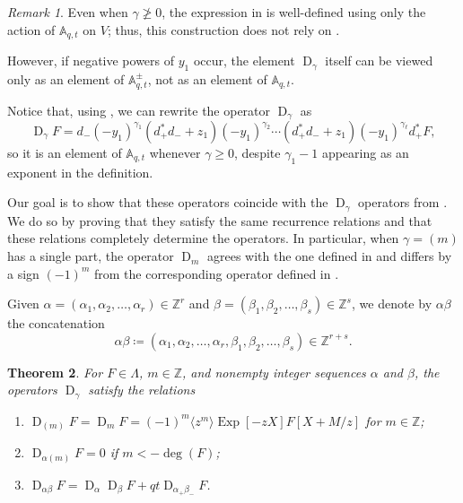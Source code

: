 \documentclass[reqno]{amsart}
\theoremstyle{plain}
\newtheorem{theorem}{Theorem}[section]
\theoremstyle{definition}
\theoremstyle{remark}
\newtheorem{remark}[theorem]{Remark}
\DeclareMathOperator{\D}{D}
\DeclareMathOperator{\Exp}{Exp}
\newcommand{\Z}{\mathbb{Z}}
\newcommand{\A}{\mathbb{A}}%
\newcommand{\<}{\langle}
\renewcommand{\>}{\rangle}
\begin{document}
\begin{remark}
    Even when $\gamma \not \geq 0$, the expression in  is well-defined using only the action of $\A_{q,t}$ on $V$; thus, this construction does not rely on .
    
    However, if negative powers of $y_1$ occur, the element $\D_\gamma$ itself can be viewed only as an 
    element of $\A_{q,t}^\pm$, not as an element of $\A_{q,t}$.

    Notice that, using , we can rewrite the operator $\D_\gamma$ as \[ \D_\gamma F = d_- (-y_1)^{\gamma_1} (d_+^* d_- + z_1) (-y_1)^{\gamma_2} \cdots (d_+^* d_- + z_1) (-y_1)^{\gamma_\ell} d_+^* F, \]
    so it is an element of $\A_{q,t}$ whenever $\gamma \geq 0$, despite $\gamma_1 - 1$ appearing as an exponent in the definition.
\end{remark}

Our goal is to show that these operators coincide with the $\D_\gamma$ operators from \cite{BHMPS2023ShuffleAnyLine}. We do so by proving that they satisfy the same recurrence relations and that these relations completely determine the operators. In particular, when $\gamma = (m)$ has a single part, the operator $\D_m$ agrees with the one defined in \cite{BHMPS2023ShuffleAnyLine} and differs by a sign $(-1)^m$ from the corresponding operator defined in \cite{GarsiaHaimanTesler1999ExplicitPlethysticFormulas}.
 
Given $\alpha=(\alpha_1,\alpha_2,\dots,\alpha_r) \in \Z^r$ and $\beta=(\beta_1,\beta_2,\dots,\beta_s) \in \Z^s$, we denote by $\alpha\beta$ the concatenation
\[ \alpha\beta \coloneqq (\alpha_1,\alpha_2,\dots,\alpha_r,\beta_1,\beta_2,\dots,\beta_s)\in \Z^{r+s}. \]

\begin{theorem}
    \label{thm:dgamma-recursion}
    For $F\in\Lambda$, $m\in\Z$, and nonempty integer sequences $\alpha$ and $\beta$, the operators $\D_\gamma$ satisfy the relations
    \begin{enumerate}
        \item \label{dop:onepart} $\D_{(m)} F = \D_m F = (-1)^m \langle z^m \rangle \Exp[-zX] F[X + M/z]$ for $m \in \mathbb{Z}$;
        \item \label{dop:neg} $\D_{\alpha (m)} F = 0$ if $m < -\deg(F)$;
        \item \label{dop:recursion} $\D_{\alpha \beta} F = \D_\alpha \D_\beta F + qt \D_{\alpha_+ \beta_-} F$.
    \end{enumerate}
\end{theorem}
\end{document}

